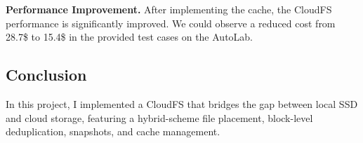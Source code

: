 \documentclass[10pt]{article}
\begin{document}
\textbf{Performance Improvement.}
After implementing the cache, the CloudFS performance is significantly improved. We could observe a reduced cost from 28.7\$ to 15.4\$ in the provided test cases on the AutoLab.

\vspace{-0.2cm}
\subsection*{Conclusion}
In this project, I implemented a CloudFS that bridges the gap between local SSD and cloud storage, featuring a hybrid-scheme file placement, block-level deduplication, snapshots, and cache management.



\end{document}
